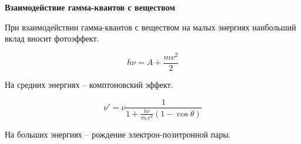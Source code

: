 \documentclass{article}
\begin{document}
    \huge{\textbf{Взаимодействие гамма-квантов с веществом}}\\\small
    
    При взаимодействии гамма-квантов с веществом на малых энергиях наибольший вклад вносит фотоэффект.
    
    \begin{equation}
        h\nu = A + \frac{mv^2}{2}
    \end{equation}
    
    На средних энергиях -- комптоновский эффект.
    
    \begin{equation}
        \nu' = \nu\frac{1}{1+\frac{h\nu}{m_e c^2}(1-\cos\theta)}
    \end{equation}
    
    На больших энергиях -- рождение электрон-позитронной пары.
    
\end{document}
